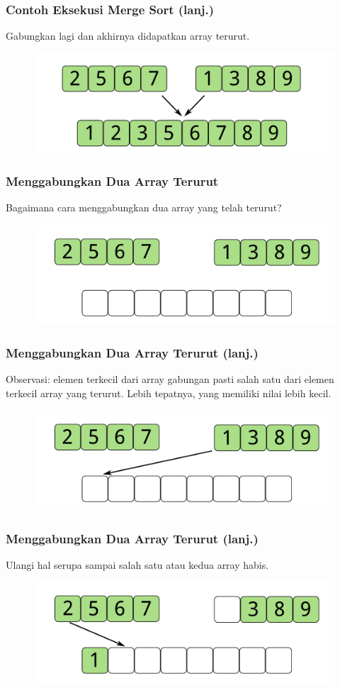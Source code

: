 \begin{frame}
\frametitle{Contoh Eksekusi Merge Sort (lanj.)}
Gabungkan lagi dan akhirnya didapatkan array terurut.
\begin{figure}
  \centering
  \includegraphics[width=10 cm]{asset/merge-sort-demo-7.pdf}
\end{figure}
\end{frame}

\begin{frame}
\frametitle{Menggabungkan Dua Array Terurut}
Bagaimana cara menggabungkan dua array yang telah terurut?
\begin{figure}
  \centering
  \includegraphics[width=10 cm]{asset/merge-array-pair-1.pdf}
\end{figure}
\end{frame}

\begin{frame}
\frametitle{Menggabungkan Dua Array Terurut (lanj.)}
Observasi: elemen terkecil dari array gabungan pasti salah satu dari elemen terkecil array yang terurut. Lebih tepatnya, yang memiliki nilai lebih kecil.
\begin{figure}
  \centering
  \includegraphics[width=10 cm]{asset/merge-array-pair-2.pdf}
\end{figure}
\end{frame}

\begin{frame}
\frametitle{Menggabungkan Dua Array Terurut (lanj.)}
Ulangi hal serupa sampai salah satu atau kedua array habis.

\begin{figure}
  \centering
  \includegraphics[width=10 cm]{asset/merge-array-pair-3.pdf}
\end{figure}
\end{frame}


